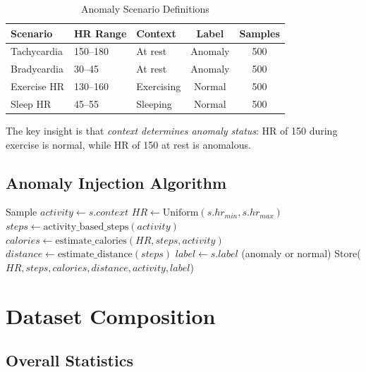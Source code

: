 \documentclass[conference]{IEEEtran}
\begin{document}
\begin{table}[H]
\centering
\caption{Anomaly Scenario Definitions}
\label{tab:anomaly_scenarios}
\begin{tabular}{lllcc}
\toprule
\textbf{Scenario} & \textbf{HR Range} & \textbf{Context} & \textbf{Label} & \textbf{Samples} \\
\midrule
Tachycardia & 150--180 & At rest & Anomaly & 500 \\
Bradycardia & 30--45 & At rest & Anomaly & 500 \\
Exercise HR & 130--160 & Exercising & Normal & 500 \\
Sleep HR & 45--55 & Sleeping & Normal & 500 \\
\bottomrule
\end{tabular}
\end{table}

The key insight is that \textit{context determines anomaly status}: HR of 150 during exercise is normal, while HR of 150 at rest is anomalous.

\subsection{Anomaly Injection Algorithm}

\begin{algorithmic}
        \STATE Sample $activity \leftarrow s.context$
        \STATE $HR \leftarrow \text{Uniform}(s.hr_{min}, s.hr_{max})$
        \STATE $steps \leftarrow \text{activity\_based\_steps}(activity)$
        \STATE $calories \leftarrow \text{estimate\_calories}(HR, steps, activity)$
        \STATE $distance \leftarrow \text{estimate\_distance}(steps)$
        \STATE $label \leftarrow s.label$ (anomaly or normal)
        \STATE Store($HR, steps, calories, distance, activity, label$)
    \ENDFOR
\ENDFOR
\end{algorithmic}

\section{Dataset Composition}

\subsection{Overall Statistics}
\end{document}
